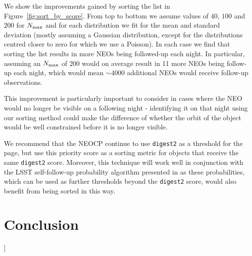 \documentclass[twocolumn, twocolappendix]{aastex631}
\newcommand{\todo}[1]{{\color{red}{[TODO: #1}]}}
\newcommand{\dig}{\texttt{digest2}}
\begin{document}
We show the improvements gained by sorting the list in Figure~\ref{fig:sort_by_score}. From top to bottom we assume values of $40$, $100$ and $200$ for $N_{\rm max}$ and for each distribution we fit for the mean and standard deviation (mostly assuming a Gaussian distribution, except for the distributions centred closer to zero for which we use a Poisson). In each case we find that sorting the list results in more NEOs being followed-up each night. In particular, assuming an $N_{\rm max}$ of 200 would on average result in 11 more NEOs being follow-up each night, which would mean ${\sim}4000$ additional NEOs would receive follow-up observations.

This improvement is particularly important to consider in cases where the NEO would no longer be visible on a following night - identifying it on that night using our sorting method could make the difference of whether the orbit of the object would be well constrained before it is no longer visible.

We recommend that the NEOCP continue to use \dig{} as a threshold for the page, but use this priority score as a sorting metric for objects that receive the same \dig{} score. Moreover, this technique will work well in conjunction with the LSST self-follow-up probability algorithm presented in \citep{sky-is-falling} as these probabilities, which can be used as further thresholds beyond the \dig{} score, would also benefit from being sorted in this way.

\section{Conclusion}

\todo{}


{}
\end{document}

